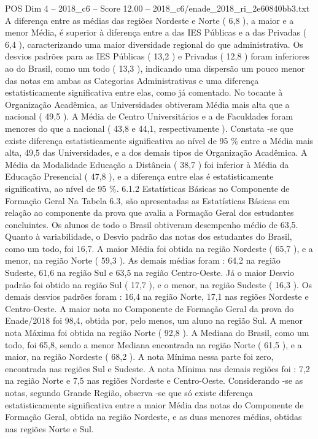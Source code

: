 \begin{textsample}{POS Dim 4 – 2018\_c6 – Score 12.00 – 2018\_c6/enade\_2018\_ri\_2e60840bb3.txt}
A diferença entre as médias das regiões Nordeste e Norte ( 6,8 ), a maior e a menor Média, é superior à diferença entre a das IES Públicas e a das Privadas ( 6,4 ), caracterizando uma maior diversidade regional do que administrativa.
Os desvios padrões para as IES Públicas ( 13,2 ) e Privadas ( 12,8 ) foram inferiores ao do Brasil, como um todo ( 13,3 ), indicando uma dispersão um pouco menor das notas em ambas as Categorias Administrativas e uma diferença estatisticamente significativa entre elas, como já comentado.
No tocante à Organização Acadêmica, as Universidades obtiveram Média mais alta que a nacional ( 49,5 ).
A Média de Centro Universitários e a de Faculdades foram menores do que a nacional ( 43,8 e 44,1, respectivamente ).
Constata -se que existe diferença estatisticamente significativa ao nível de 95 \% entre a Média mais alta, 49,5 das Universidades, e a dos demais tipos de Organização Acadêmica.
A Média da Modalidade Educação a Distância ( 38,7 ) foi inferior à Média da Educação Presencial ( 47,8 ), e a diferença entre elas é estatisticamente significativa, ao nível de 95 \%. 6.1.2 Estatísticas Básicas no Componente de Formação Geral Na Tabela 6.3, são apresentadas as Estatísticas Básicas em relação ao componente da prova que avalia a Formação Geral dos estudantes concluintes.
Os alunos de todo o Brasil obtiveram desempenho médio de 63,5.
Quanto à variabilidade, o Desvio padrão das notas dos estudantes do Brasil, como um todo, foi 16,7.
A maior Média foi obtida na região Nordeste ( 65,7 ), e a menor, na região Norte ( 59,3 ).
As demais médias foram : 64,2 na região Sudeste, 61,6 na região Sul e 63,5 na região Centro-Oeste.
Já o maior Desvio padrão foi obtido na região Sul ( 17,7 ), e o menor, na região Sudeste ( 16,3 ).
Os demais desvios padrões foram : 16,4 na região Norte, 17,1 nas regiões Nordeste e Centro-Oeste.
A maior nota no Componente de Formação Geral da prova do Enade/2018 foi 98,4, obtida por, pelo menos, um aluno na região Sul.
A menor nota Máxima foi obtida na região Norte ( 92,8 ).
A Mediana do Brasil, como um todo, foi 65,8, sendo a menor Mediana encontrada na região Norte ( 61,5 ), e a maior, na região Nordeste ( 68,2 ).
A nota Mínima nessa parte foi zero, encontrada nas regiões Sul e Sudeste.
A nota Mínima nas demais regiões foi : 7,2 na região Norte e 7,5 nas regiões Nordeste e Centro-Oeste.
Considerando -se as notas, segundo Grande Região, observa -se que só existe diferença estatisticamente significativa entre a maior Média das notas do Componente de Formação Geral, obtida na região Nordeste, e as duas menores médias, obtidas nas regiões Norte e Sul.

\end{textsample}
